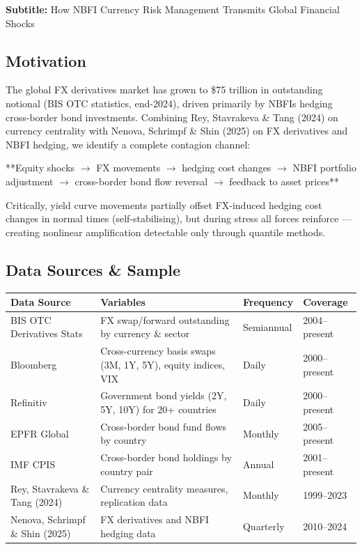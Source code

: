 \documentclass[11pt,a4paper]{article}
\begin{document}
\textbf{Subtitle:} How NBFI Currency Risk Management Transmits Global Financial Shocks


\subsection{Motivation}

The global FX derivatives market has grown to \$75 trillion in outstanding
notional (BIS OTC statistics, end-2024), driven primarily by NBFIs hedging
cross-border bond investments. Combining Rey, Stavrakeva \& Tang (2024) on
currency centrality with Nenova, Schrimpf \& Shin (2025) on FX derivatives and
NBFI hedging, we identify a complete contagion channel:

**Equity shocks $\rightarrow$ FX movements $\rightarrow$ hedging cost changes $\rightarrow$ NBFI portfolio
adjustment $\rightarrow$ cross-border bond flow reversal $\rightarrow$ feedback to asset prices**

Critically, yield curve movements partially offset FX-induced hedging cost
changes in normal times (self-stabilising), but during stress all forces
reinforce --- creating nonlinear amplification detectable only through quantile
methods.


\subsection{Data Sources \& Sample}


{\small
\begin{longtable}{|p{}|p{}|p{}|p{}|}
\hline
\textbf{Data Source} & \textbf{Variables} & \textbf{Frequency} & \textbf{Coverage} \\
\hline
\endhead
BIS OTC Derivatives Stats & FX swap/forward outstanding by currency \& sector & Semiannual & 2004--present \\
\hline
Bloomberg & Cross-currency basis swaps (3M, 1Y, 5Y), equity indices, VIX & Daily & 2000--present \\
\hline
Refinitiv & Government bond yields (2Y, 5Y, 10Y) for 20+ countries & Daily & 2000--present \\
\hline
EPFR Global & Cross-border bond fund flows by country & Monthly & 2005--present \\
\hline
IMF CPIS & Cross-border bond holdings by country pair & Annual & 2001--present \\
\hline
Rey, Stavrakeva \& Tang (2024) & Currency centrality measures, replication data & Monthly & 1999--2023 \\
\hline
Nenova, Schrimpf \& Shin (2025) & FX derivatives and NBFI hedging data & Quarterly & 2010--2024 \\
\hline
\end{longtable}
}
\end{document}
